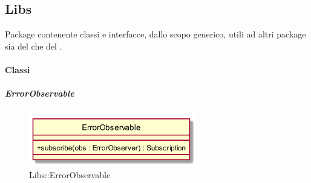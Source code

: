 \subsection{Libs}
Package contenente classi e interfacce, dallo scopo generico, utili ad altri package sia del  che del .
\paragraph{Classi}
\hypertarget{ErrorObservable_label}{\subparagraph{ErrorObservable}}
\begin{figure}[h]
	\centering
	\includegraphics[width=0.65\textwidth,height=\textheight,keepaspectratio]{images/ClassErrorObservable.png}
	\caption{Libs::ErrorObservable}
\end{figure}
